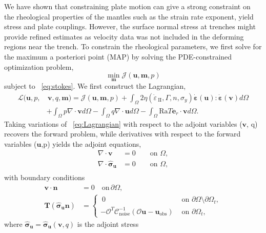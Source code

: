 \documentclass[12pt]{article}
\newcommand{\IIinv}{{\dot\varepsilon}_{\mathrm{\!\!\:II}}}
\newcommand{\mm}{{\ensuremath{\boldsymbol{m}}}}
\newcommand{\uu}{{\ensuremath{\boldsymbol{u}}}}
\newcommand{\vv}{{\ensuremath{\boldsymbol{v}}}}
\newcommand{\ssigma}{{\ensuremath{\boldsymbol{\sigma}}}}
\newcommand{\strain}{{\ensuremath{\dot{\boldsymbol{\varepsilon}}}}}
\begin{document}
 We have shown that constraining plate motion can give a strong constraint on the rheological properties of the mantles such as the strain rate exponent, yield stress and plate couplings. However, the surface normal stress at trenches might provide refined estimates as velocity data was not included in the deforming regions near the trench. To constrain the rheological parameters, we first
solve for the maximum a posteriori point (MAP) by solving the PDE-constrained optimization problem,
\begin{equation}
\underset{\mm}{\min} \mathcal{J}(\uu,\mm, p)
\end{equation}
subject to ~\eqref{eq:stokes}. We first construct the Lagrangian,
\begin{equation} \label{eq:Lagrangian}
\begin{split}
  \mathcal{L}(\uu,p,&\,\vv,q,\mm)=
  \mathcal{J}(\uu,\mm,p)+\!\!\int_{\Omega}
  \!2\eta(\IIinv,\Gamma, n, \sigma_y)\strain(\uu):\strain(\vv)d\Omega \\&
  +\int_{\Omega} p\nabla \cdot \vv d\Omega - \int_{\Omega} q \nabla \cdot
  \uu d\Omega -\int_{\Omega}\text{Ra}T \textbf{e}_r \cdot \vv d\Omega.
\end{split}
\end{equation}
Taking variations of ~\eqref{eq:Lagrangian} with respect to the adjoint variables (\vv, q) recovers the forward problem, while derivatives with respect to the forward variables (\uu,p) yields the adjoint equations,
\begin{equation}
  \label{eq:adjoint}
  \begin{split}
    \nabla \cdot \vv &=0 \qquad  \text{on } \Omega, \\
    \nabla \cdot \hat \ssigma_\uu&=0  \qquad \text{on } \Omega, \\
  \end{split}
\end{equation}
with boundary conditions 
\begin{align*}
  \vv\cdot \textbf{n}&=0 \quad \text{on} \, \partial \Omega, \\
  \textbf{T}(\hat\ssigma_\uu \textbf{n})
  &=\begin{cases} \:0 & \text{ on }\partial \Omega\setminus
  \partial\Omega_t, \\
  -\mathcal{O}^T\mathcal{C}^{-1}_{\text{noise}}(\mathcal O \uu-\uu_{\text{obs}}) &\text{ on }
  \partial\Omega_t,
  \end{cases}
  \label{eq:adjoint}
\end{align*}
where $\hat\ssigma_\uu = \hat\ssigma_\uu(\vv,q)$ is the adjoint stress
\end{document}
